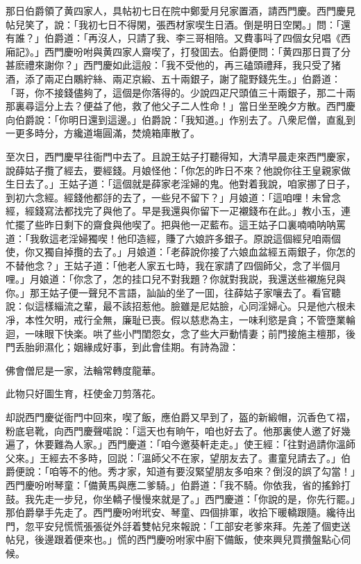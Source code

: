 那日伯爵領了黄四家人，具帖初七日在院中鄭愛月兒家置酒，請西門慶。西門慶見帖兒笑了，說：「我初七日不得閑，張西材家喫生日酒。倒是明日空閑。」問：「還有誰？」伯爵道：「再沒人，只請了我、李三哥相陪。又費事呌了四個女兒唱《西廂記》。」西門慶吩咐與黄四家人齋喫了，打發囬去。伯爵便問：「黄四那日買了分甚麽禮來謝你？」西門慶如此這般：「我不受他的，再三磕頭禮拜，我只受了猪酒，添了兩疋白鷴紵絲、兩疋京緞、五十兩銀子，謝了龍野錢先生。」伯爵道：「哥，你不接錢儘夠了，這個是你落得的。少說四疋尺頭值三十兩銀子，那二十兩那裏尋這分上去？便益了他，救了他父子二人性命！」當日坐至晚夕方散。西門慶向伯爵說：「你明日還到這邊。」伯爵說：「我知道。」作别去了。八衆尼僧，直亂到一更多時分，方纔道塲圓滿，焚燒箱庫散了。

至次日，西門慶早往衙門中去了。且說王姑子打聽得知，大清早晨走來西門慶家，說薛姑子攬了經去，要經錢。月娘怪他：「你怎的昨日不來？他說你往王皇親家做生日去了。」王姑子道：「這個就是薛家老淫婦的鬼。他對着我說，咱家挪了日子，到初六念經。經錢他都㧱的去了，一些兒不留下？」月娘道：「這咱哩！未曾念經，經錢寫法都找完了與他了。早是我還與你留下一疋襯錢布在此。」教小玉，連忙擺了些昨日剩下的齋食與他喫了。把與他一疋藍布。這王姑子口裏喃喃呐呐罵道：「我敎這老淫婦獨喫！他印造經，賺了六娘許多銀子。原說這個經兒咱兩個使，你又獨自掉攬的去了。」月娘道：「老薛說你接了六娘血盆經五兩銀子，你怎的不替他念？」王姑子道：「他老人家五七時，我在家請了四個師父，念了半個月哩。」月娘道：「你念了，怎的挂口兒不對我題？你就對我説，我還送些襯施兒與你。」那王姑子便一聲兒不言語，訕訕的坐了一囬，往薛姑子家嚷去了。看官聽說：似這樣緇流之輩，最不該招惹他。臉雖是尼姑臉，心同淫婦心。只是他六根未凈，本性欠明，戒行全無，廉耻已喪。假以慈悲為主，一味利慾是貪；不管墮業輪迴，一味眼下快楽。哄了些小門閨怨女，念了些大戸動情妻；前門接施主檀那，後門丢胎卵濕化；姻緣成好事，到此會佳期。有詩為證：

\begin{myquote}
佛會僧尼是一家，法輪常轉度龍華。

此物只好圖生育，枉使金刀剪落花。
\end{myquote}

却説西門慶従衙門中回來，喫了飯，應伯爵又早到了，盔的新緞帽，沉香色て褶，粉底皂靴，向西門慶聲喏說：「這天也有晌午，咱也好去了。他那裏使人邀了好幾遍了，休要難為人家。」西門慶道：「咱今邀葵軒走走。」使王經：「往對過請你溫師父來。」王經去不多時，回説：「溫師父不在家，望朋友去了。畫童兒請去了。」伯爵便說：「咱等不的他。秀才家，知道有要沒緊望朋友多咱來？倒沒的誤了勾當！」西門慶吩咐琴童：「備黄馬與應二爹騎。」伯爵道：「我不騎。你依我，省的搖鈴打鼓。我先走一步兒，你坐轎子慢慢來就是了。」西門慶道：「你說的是，你先行罷。」那伯爵擧手先走了。西門慶吩咐玳安、琴童、四個排軍，收拾下暖轎跟隨。纔待出門，忽平安兒慌慌張張従外㧱着雙帖兒來報說：「工部安老爹來拜。先差了個吏送帖兒，後邊跟着便來也。」慌的西門慶吩咐家中廚下備飯，使來興兒買攢盤點心伺候。

